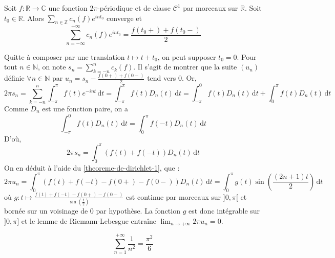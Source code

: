 	\begin{theorem}[Dirichlet]
		\label{theoreme-de-dirichlet-2}
		Soit $f : \mathbb{R} \rightarrow \mathbb{C}$ une fonction $2 \pi$-périodique et de classe $\mathcal{C}^1$ par morceaux sur $\mathbb{R}$. Soit $t_0 \in \mathbb{R}$. Alors $\sum_{n \in \mathbb{Z}} c_n(f) e^{int_0}$ converge et
		\[ \sum_{n = -\infty}^{+\infty} c_n(f) e^{int_0} = \frac{f(t_0+) + f(t_0-)}{2} \]
	\end{theorem}

	\begin{demonstration}
		Quitte à composer par une translation $t \mapsto t + t_0$, on peut supposer $t_0 = 0$. Pour tout $n \in \mathbb{N}$, on note $s_n = \sum_{k=-n}^n c_k(f)$. Il s'agit de montrer que la suite $(u_n)$ définie $\forall n \in \mathbb{N}$ par $u_n = s_n - \frac{f(0+) + f(0-)}{2}$ tend vers $0$. Or,
		\[ 2\pi s_n = \sum_{k=-n}^n \int_{-\pi}^{\pi} f(t) e^{-int} \, \mathrm{d}t = \int_{-\pi}^{\pi} f(t) D_n(t) \, \mathrm{d}t = \int^0_{-\pi} f(t) D_n(t) \, \mathrm{d}t + \int_0^{\pi} f(t) D_n(t) \, \mathrm{d}t \]
		Comme $D_n$ est une fonction paire, on a
		\[ \int^0_{-\pi} f(t) D_n(t) \, \mathrm{d}t = \int_0^{\pi} f(-t) D_n(t) \, \mathrm{d}t \]
		D'où,
		\[ 2 \pi s_n = \int_0^{\pi} (f(t) + f(-t)) D_n(t) \, \mathrm{d}t \]
		On en déduit à l'aide du \cref{theoreme-de-dirichlet-1}, que :
		\[ 2 \pi u_n = \int_0^{\pi} (f(t) + f(-t) - f(0+) - f(0-)) D_n(t) \, \mathrm{d}t = \int_0^{\pi} g(t) \sin \left ( \frac{(2n + 1)t}{2} \right) \, \mathrm{d}t \]
		où $g : t \mapsto \frac{f(t) + f(-t) - f(0+) - f(0-)}{\sin \left ( \frac{t}{2} \right)}$ est continue par morceaux sur $]0, \pi[$ et bornée sur un voisinage de $0$ par hypothèse. La fonction $g$ est donc intégrable sur $]0, \pi]$ et le lemme de Riemann-Lebesgue entraîne $\lim_{n \rightarrow +\infty} 2 \pi u_n = 0$.
	\end{demonstration}

	\begin{application}
		\[ \sum_{n=1}^{+\infty} \frac{1}{n^2} = \frac{\pi^2}{6} \]
	\end{application}

